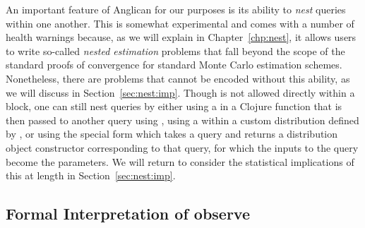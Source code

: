 An important feature of Anglican for our purposes is its ability to \emph{nest} queries within one another.  This
is somewhat experimental and comes with a number of health warnings because, as we will explain in Chapter~\ref{chp:nest},
it allows users to write so-called \emph{nested estimation} problems that fall beyond the scope of the standard
proofs of convergence for standard Monte Carlo estimation schemes. Nonetheless, there are problems that cannot
be encoded without this ability, as we will discuss in Section~\ref{sec:nest:imp}.
Though \doquery is not allowed directly within a  block, one can still nest queries by 
either using a \doquery in a Clojure function that is then passed to another query using {\small {}},
using a \doquery within a custom distribution defined by , or using the special form \conditional which
takes a query and returns a distribution object constructor corresponding to that query, 
for which the inputs to the query become the parameters.
We will return to consider the statistical implications of this at length in Section~\ref{sec:nest:imp}.

\subsection{Formal Interpretation of observe}
\label{sec:probprog:anglican:observe}


